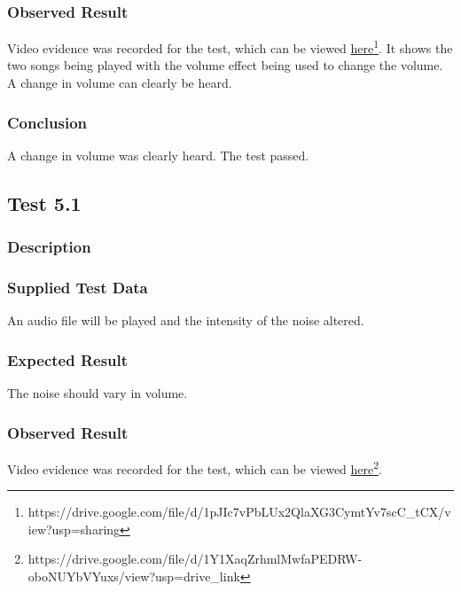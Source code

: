 \subsubsection{Observed Result}
\label{sec:evidence4.3}
Video evidence was recorded for the test, which can be viewed \href{https://drive.google.com/file/d/1pJIc7vPbLUx2QlaXG3CymtYv7scC_tCX/view?usp=sharing}{here}\footnote{
	https://drive.google.com/file/d/1pJIc7vPbLUx2QlaXG3CymtYv7scC\_tCX/view?usp=sharing
}. It shows the two songs being played with the volume effect being used to change the volume. A change in volume can clearly be heard.

\subsubsection{Conclusion}
A change in volume was clearly heard. The test passed.


\pagebreak
\subsection{Test 5.1}
\subsubsection{Description}
\paragraph{}
{
	\centering
}

\subsubsection{Supplied Test Data}
An audio file will be played and the intensity of the noise altered.

\subsubsection{Expected Result}
The noise should vary in volume.

\subsubsection{Observed Result}
\label{sec:evidence5.1}
Video evidence was recorded for the test, which can be viewed \href{https://drive.google.com/file/d/1Y1XaqZrhmlMwfaPEDRW-oboNUYbVYuxs/view?usp=drive_link}{here}\footnote{
	https://drive.google.com/file/d/1Y1XaqZrhmlMwfaPEDRW-oboNUYbVYuxs/view?usp=drive\_link
}.

